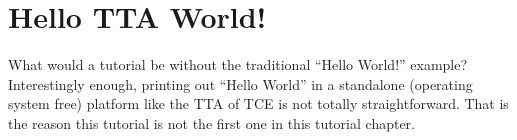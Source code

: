\documentclass[twoside]{tceusermanual}
\begin{document}
% 
%
%
%
%
%


%



\section{Hello TTA World!}

What would a tutorial be without the traditional ``Hello World!''
example? Interestingly enough, printing out ``Hello World'' in a
standalone (operating system free) platform like the TTA of TCE is not 
totally straightforward. That is the reason this tutorial is not the first 
one in this tutorial chapter.
\end{document}
